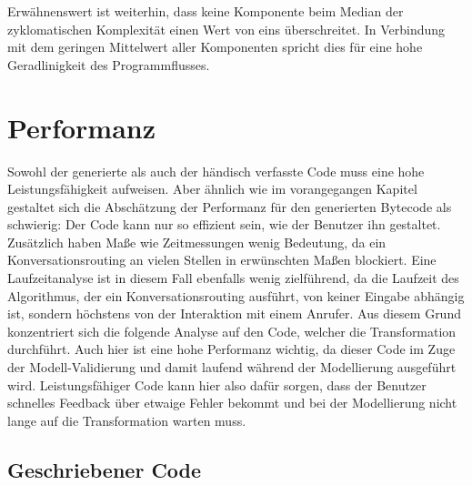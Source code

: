 \newline
Erwähnenswert ist weiterhin, dass keine Komponente beim Median der zyklomatischen Komplexität einen Wert von eins überschreitet. In Verbindung mit dem geringen Mittelwert aller Komponenten spricht dies für eine hohe Geradlinigkeit des Programmflusses. 

\section{Performanz}
Sowohl der generierte als auch der händisch verfasste Code muss eine hohe Leistungsfähigkeit aufweisen. Aber ähnlich wie im vorangegangen Kapitel gestaltet sich die Abschätzung der Performanz für den generierten Bytecode als schwierig: Der Code kann nur so effizient sein, wie der Benutzer ihn gestaltet. Zusätzlich haben Maße wie Zeitmessungen wenig Bedeutung, da ein Konversationsrouting an vielen Stellen in erwünschten Maßen blockiert. Eine Laufzeitanalyse ist in diesem Fall ebenfalls wenig zielführend, da die Laufzeit des Algorithmus, der ein Konversationsrouting ausführt, von keiner Eingabe abhängig ist, sondern höchstens von der Interaktion mit einem Anrufer.
\newline
Aus diesem Grund konzentriert sich die folgende Analyse auf den Code, welcher die Transformation durchführt. Auch hier ist eine hohe Performanz wichtig, da dieser Code im Zuge der Modell-Validierung und damit laufend während der Modellierung ausgeführt wird. Leistungsfähiger Code kann hier also dafür sorgen, dass der Benutzer schnelles Feedback über etwaige Fehler bekommt und bei der Modellierung nicht lange auf die Transformation warten muss.

\subsection{Geschriebener Code}

